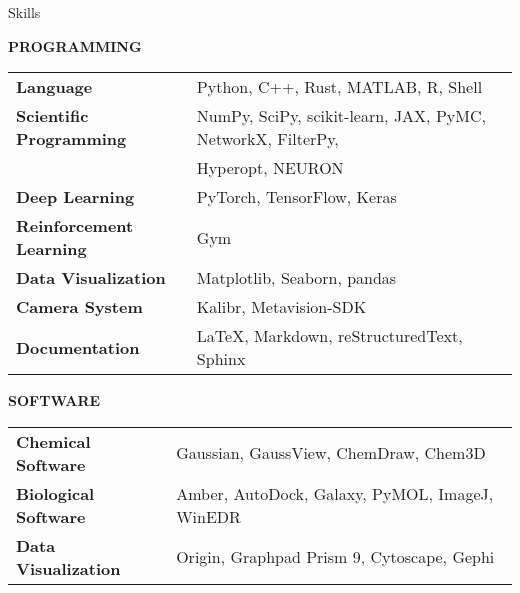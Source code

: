 \begin{rSection}{Skills}

    \textbf{PROGRAMMING}
    
    \begin{tabular}{m{7cm} m{15cm}}
        \hspace{2em} \textbf{Language} & Python, C++, Rust, MATLAB, R, Shell \\ 
        \hspace{2em} \textbf{Scientific Programming} & NumPy, SciPy, scikit-learn, JAX, PyMC, NetworkX, FilterPy, \\
                                        & Hyperopt, NEURON \\
        \hspace{2em} \textbf{Deep Learning} & PyTorch, TensorFlow, Keras \\
        \hspace{2em} \textbf{Reinforcement Learning} & Gym \\
        \hspace{2em} \textbf{Data Visualization} & Matplotlib, Seaborn, pandas \\
        \hspace{2em} \textbf{Camera System} & Kalibr, Metavision-SDK \\
        \hspace{2em} \textbf{Documentation} & LaTeX, Markdown, reStructuredText, Sphinx 
    \end{tabular}

    \textbf{SOFTWARE}
    
    \begin{tabular}{m{7cm} m{15cm}}
        \hspace{2em} \textbf{Chemical Software} & Gaussian, GaussView, ChemDraw, Chem3D \\ 
        \hspace{2em} \textbf{Biological Software} & Amber, AutoDock, Galaxy, PyMOL, ImageJ, WinEDR \\ 
        \hspace{2em} \textbf{Data Visualization} & Origin, Graphpad Prism 9, Cytoscape, Gephi
    \end{tabular}
    

    
\end{rSection}